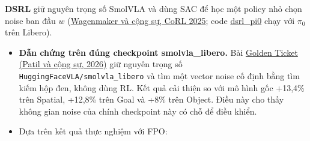 \documentclass[11pt,a4paper]{article}
\newcommand{\code}[1]{\texttt{#1}}
\begin{document}
\textbf{DSRL} giữ nguyên trọng số SmolVLA và dùng SAC để học một policy nhỏ chọn noise ban đầu $w$ (\href{https://arxiv.org/abs/2506.15799}{Wagenmaker và cộng sự, CoRL 2025}; code \href{https://github.com/nakamotoo/dsrl_pi0}{dsrl\_pi0} chạy với $\pi_0$ trên Libero).
\begin{itemize}
  \item \textbf{Dẫn chứng trên đúng checkpoint smolvla\_libero.} Bài \href{https://arxiv.org/abs/2603.15757}{Golden Ticket (Patil và cộng sự, 2026)} giữ nguyên trọng số \code{HuggingFaceVLA/smolvla\_libero} và tìm một vector noise cố định bằng tìm kiếm hộp đen, không dùng RL. Kết quả cải thiện so với mô hình gốc +13,4\% trên Spatial, +12,8\% trên Goal và +8\% trên Object. Điều này cho thấy không gian noise của chính checkpoint này có chỗ để điều khiển.
  \item Dựa trên kết quả thực nghiệm với FPO: %
\end{itemize}

\end{document}
